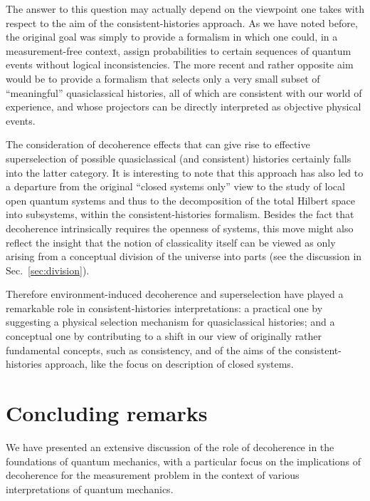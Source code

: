 \documentclass[twocolumn,rmp,aps,amsmath,amsfonts,noshowkeys,noshowpacs]{revtex4}
\begin{document}
The answer to this question may actually depend on the viewpoint one
takes with respect to the aim of the consistent-histories approach. As
we have noted before, the original goal was simply to provide a
formalism in which one could, in a measurement-free context, assign
probabilities to certain sequences of quantum events without logical
inconsistencies. The more recent and rather opposite aim would be to
provide a formalism that selects only a very small subset of
``meaningful'' quasiclassical histories, all of which are consistent
with our world of experience, and whose projectors can be directly
interpreted as objective physical events.

The consideration of decoherence effects that can give rise to
effective superselection of possible quasiclassical (and consistent)
histories certainly falls into the latter category. It is interesting
to note that this approach has also led to a departure from the
original ``closed systems only'' view to the study of local open
quantum systems and thus to the decomposition of the total Hilbert
space into subsystems, within the consistent-histories formalism.
Besides the fact that decoherence intrinsically requires the openness
of systems, this move might also reflect the insight that the notion
of classicality itself can be viewed as only arising from a conceptual
division of the universe into parts (see the discussion in
Sec.~\ref{sec:division}).

Therefore environment-induced decoherence and superselection have
played a remarkable role in consistent-histories interpretations: a
practical one by suggesting a physical selection mechanism for
quasiclassical histories; and a conceptual one by contributing to a
shift in our view of originally rather fundamental concepts, such as
consistency, and of the aims of the consistent-histories approach,
like the focus on description of closed systems.


\section{Concluding remarks}

We have presented an extensive discussion of the role of decoherence
in the foundations of quantum mechanics, with a particular focus on
the implications of decoherence for the measurement problem in the
context of various interpretations of quantum mechanics.
\end{document}
